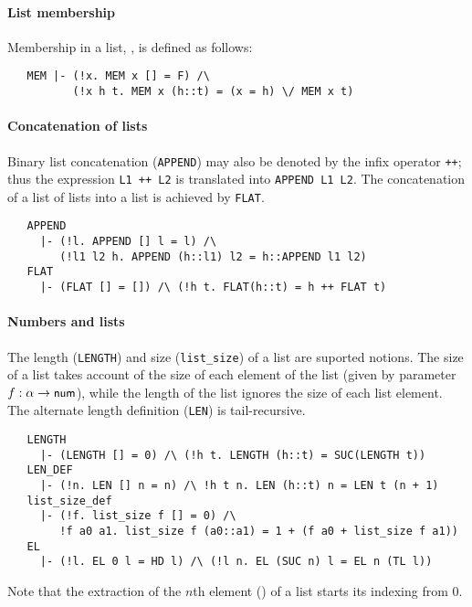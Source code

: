 \paragraph{List membership}

Membership in a list, , is defined as follows:
%
{\small
\begin{verbatim}
   MEM |- (!x. MEM x [] = F) /\
          (!x h t. MEM x (h::t) = (x = h) \/ MEM x t)
\end{verbatim}
}

\paragraph {Concatenation of lists}

Binary list concatenation ({\small\verb+APPEND+}) may also be denoted by
the infix operator {\small\verb|++|}; thus the expression
{\small\verb|L1 ++ L2|} is translated into {\small\verb+APPEND L1 L2+}.
The concatenation of a list of lists into a list is achieved by
{\small\verb+FLAT+}.
%
{\small
\begin{verbatim}
   APPEND
     |- (!l. APPEND [] l = l) /\
        (!l1 l2 h. APPEND (h::l1) l2 = h::APPEND l1 l2)
   FLAT
     |- (FLAT [] = []) /\ (!h t. FLAT(h::t) = h ++ FLAT t)
\end{verbatim}
}

\paragraph {Numbers and lists}

The length ({\small\verb+LENGTH+}) and size ({\small\verb+list_size+})
of a list are suported notions. The size of a list takes account of
the size of each element of the list (given by parameter
$f:\alpha\to\mbox{\small{\textbf{\sf{num}}}}$), while the length of the list ignores the
size of each list element. The alternate length definition
({\small\verb+LEN+}) is tail-recursive.
%
{\small
\begin{verbatim}
   LENGTH
     |- (LENGTH [] = 0) /\ (!h t. LENGTH (h::t) = SUC(LENGTH t))
   LEN_DEF
     |- (!n. LEN [] n = n) /\ !h t n. LEN (h::t) n = LEN t (n + 1)
   list_size_def
     |- (!f. list_size f [] = 0) /\
        !f a0 a1. list_size f (a0::a1) = 1 + (f a0 + list_size f a1))
   EL
     |- (!l. EL 0 l = HD l) /\ (!l n. EL (SUC n) l = EL n (TL l))
\end{verbatim}
}

\noindent
Note that the extraction of the $n$th element () of a
list starts its indexing from 0.

